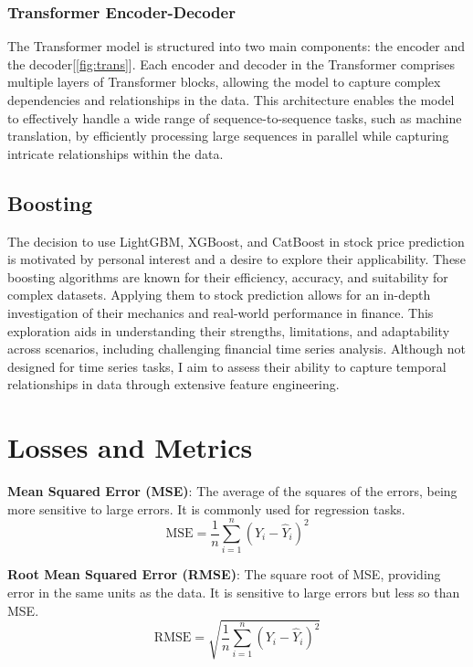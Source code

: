 \documentclass[10pt,twocolumn,letterpaper]{article}
\begin{document}
\subsubsection{Transformer Encoder-Decoder}
\label{sec:transformer-enc-dec}
The Transformer model is structured into two main components: the encoder and the decoder[\ref{fig:trans}]. Each encoder and decoder in the Transformer comprises multiple layers of Transformer blocks, allowing the model to capture complex dependencies and relationships in the data\cite{vaswani2017attention}. This architecture enables the model to effectively handle a wide range of sequence-to-sequence tasks, such as machine translation, by efficiently processing large sequences in parallel while capturing intricate relationships within the data.

\subsection{Boosting}
\label{sec:bst}
The decision to use LightGBM, XGBoost, and CatBoost\cite{chen2016xgboost, prokhorenkova2018catboost, ke2017lightgbm} in stock price prediction is motivated by personal interest and a desire to explore their applicability.
These boosting algorithms are known for their efficiency, accuracy, and suitability for complex datasets.
Applying them to stock prediction allows for an in-depth investigation of their mechanics and real-world performance in finance.
This exploration aids in understanding their strengths, limitations, and adaptability across scenarios, including challenging financial time series analysis. Although not designed for time series tasks, I aim to assess their ability to capture temporal relationships in data through extensive feature engineering.

\section{Losses and Metrics}
\label{sec:le}
\textbf{Mean Squared Error (MSE)}: The average of the squares of the errors, being more sensitive to large errors. It is commonly used for regression tasks.
\begin{equation}
    \text{MSE} = \frac{1}{n} \sum_{i=1}^{n} (Y_i - \hat{Y}_i)^2
\end{equation}

\textbf{Root Mean Squared Error (RMSE)}: The square root of MSE, providing error in the same units as the data. It is sensitive to large errors but less so than MSE.
\begin{equation}
    \text{RMSE} = \sqrt{\frac{1}{n} \sum_{i=1}^{n} (Y_i - \hat{Y}_i)^2}
\end{equation}
\end{document}
